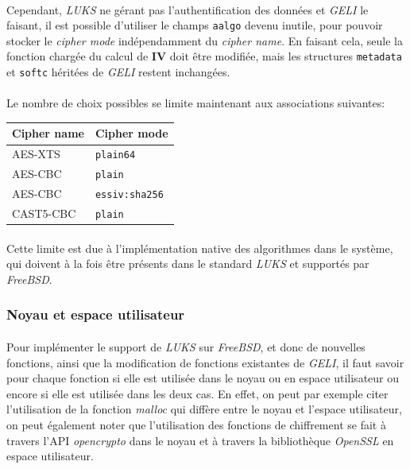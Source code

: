 \paragraph{}
Cependant, \textit{LUKS} ne gérant pas l'authentification des données et
\textit{GELI} le faisant, il est possible d'utiliser le champs \texttt{aalgo}
devenu inutile, pour pouvoir stocker le \textit{cipher mode} indépendamment du
\textit{cipher name}. En faisant cela, seule la fonction chargée du calcul de
\textbf{IV} doit être modifiée, mais les structures \texttt{metadata} et
\texttt{softc} héritées de \textit{GELI} restent inchangées.
\paragraph{}
Le nombre de choix possibles se limite maintenant aux associations suivantes:
\begin{center}
  \begin{tabular}{ | l | l | }
    \hline
    \textbf{Cipher name} & \textbf{Cipher mode}  \\
    \hline
    AES-XTS              & \texttt{plain64}      \\
    AES-CBC              & \texttt{plain}        \\
    AES-CBC              & \texttt{essiv:sha256} \\
    CAST5-CBC            & \texttt{plain}        \\
    \hline
  \end{tabular}
\end{center}
\paragraph{}
Cette limite est due à l'implémentation native des algorithmes dans le système,
qui doivent à la fois être présents dans le standard \textit{LUKS} et supportés
par \textit{FreeBSD}.


\subsubsection{Noyau et espace utilisateur}
\paragraph{}
Pour implémenter le support de {\em LUKS} sur {\em FreeBSD}, et donc de nouvelles
fonctions, ainsi que la modification de fonctions existantes de {\em GELI}, il
faut savoir pour chaque fonction si elle est utilisée dans le noyau ou en espace
utilisateur ou encore si elle est utilisée dans les deux cas. En effet, on peut
par exemple citer l'utilisation de la fonction {\em malloc} qui diffère entre
le noyau et l'espace utilisateur, on peut également noter que l'utilisation des
fonctions de chiffrement se fait à travers l'API {\em opencrypto} dans le noyau
et à travers la bibliothèque {\em OpenSSL} en espace utilisateur. 

